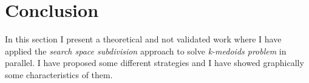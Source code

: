 %
%
%
%
%
%

\section{Conclusion}

In this section I present a theoretical and not validated work where I have applied the {\it search space subdivision} approach to solve {\it k-medoids problem} in parallel. I have proposed some different strategies and I have showed graphically some characteristics of them. 